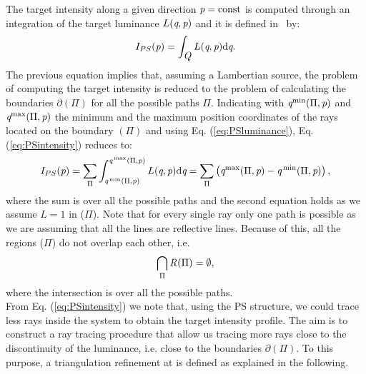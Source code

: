 The target intensity along a given direction $\textit{p}=\textrm{const}$ is computed through an integration of the target luminance $L(\textit{q}, \textit{p})$ and it is defined in $\,$ by:
\begin{equation}
\label{eq:PSintensity}
I_{PS}(\textit{p}) = \int_{\mbox{$\emph{Q}_{\textit{}}$}}L(\textit{q}, \textit{p}) \textrm{d}\textit{q}.
\end{equation}
The previous equation implies that, assuming a Lambertian source, the problem of computing the target intensity is reduced to the problem of calculating the boundaries
$\partial$$(\Pi)$ for all the possible paths $\Pi$. Indicating with $\textit{q}^\textrm{min}(\Pi,\textit{p})$ and $\textit{q}^\textrm{max}(\Pi,\textit{p})$ the minimum and the maximum position coordinates of the rays located on the boundary $(\Pi)$ and using Eq. (\ref{eq:PSluminance}), Eq. (\ref{eq:PSintensity}) reduces to:
\begin{equation}\label{eta2}
I_{PS}(\textit{p}) = \sum_{\Pi}\int_{\textit{q}^\textrm{\,min}(\Pi, \textit{p})}^{\textit{q}^\textrm{\,max}(\Pi,\textit{p})}L(\textit{q}, \textit{p})\textrm{d}\textit{q} = \sum_{\Pi}\big (\textit{q}^\textrm{max}(\Pi,\textit{p})-\textit{q}^\textrm{\,min}(\Pi,\textit{p})\big )\,,
\end{equation}
where the sum is over all the possible paths and the second equation holds as we assume $L=1$ in ($\Pi$).
Note that for every single ray only one path is possible as we are assuming that all the lines are reflective lines.
Because of this, all the regions ($\Pi$) do not overlap each other, i.e.
\begin{equation}
\bigcap_{\Pi}\mbox{$\emph{R}_{\textit{}}$}(\Pi)= \emptyset,
\end{equation}
where the intersection is over all the possible paths. \\ \indent
From Eq. (\ref{eq:PSintensity}) we note that, using the PS structure, we could trace less rays inside the system to obtain the target intensity profile.
The aim is to construct a ray tracing procedure that allow us tracing more rays close to the discontinuity of the luminance, i.e. close to the boundaries $\partial$$(\Pi)$.
To this purpose, a triangulation refinement at  is defined as explained in the following. \\ \indent
